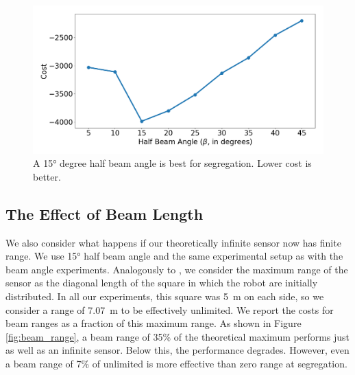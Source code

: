 \documentclass[conference]{IEEEtran}
\begin{document}
    \begin{figure}[H]
      \centering
      \includegraphics[width=1\linewidth]{./images/beam_angle.png}
      \caption{A \ang{15} degree half beam angle is best for segregation. Lower cost is better.}
      \label{fig:beam_angle}
    \end{figure}

  \subsection{The Effect of Beam Length} \label{section:beam_range}

    We also consider what happens if our theoretically infinite sensor now has finite range. We use \ang{15} half beam angle and the same experimental setup as with the beam angle experiments. Analogously to \cite{gauci_self-organized_2014}, we consider the maximum range of the sensor as the diagonal length of the square in which the robot are initially distributed. In all our experiments, this square was \SI{5}{\meter} on each side, so we consider a range of \SI{7.07}{\meter} to be effectively unlimited. We report the costs for beam ranges as a fraction of this maximum range. As shown in Figure \ref{fig:beam_range}, a beam range of 35\% of the theoretical maximum performs just as well as an infinite sensor. Below this, the performance degrades. However, even a beam range of 7\% of unlimited is more effective than zero range at segregation.
\end{document}
